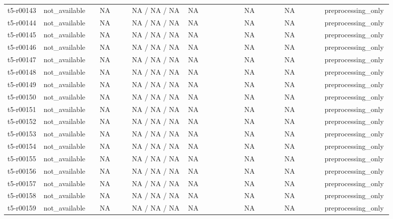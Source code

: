 \begin{longtable}{@{}p{0.09\linewidth}p{0.14\linewidth}p{0.08\linewidth}p{0.14\linewidth}p{0.14\linewidth}p{0.1\linewidth}p{0.1\linewidth}p{0.11\linewidth}@{}}
t5-r00143 & not\_\allowbreak{}available & NA & NA / NA / NA & NA & NA & NA & preprocessing\_\allowbreak{}only \\
t5-r00144 & not\_\allowbreak{}available & NA & NA / NA / NA & NA & NA & NA & preprocessing\_\allowbreak{}only \\
t5-r00145 & not\_\allowbreak{}available & NA & NA / NA / NA & NA & NA & NA & preprocessing\_\allowbreak{}only \\
t5-r00146 & not\_\allowbreak{}available & NA & NA / NA / NA & NA & NA & NA & preprocessing\_\allowbreak{}only \\
t5-r00147 & not\_\allowbreak{}available & NA & NA / NA / NA & NA & NA & NA & preprocessing\_\allowbreak{}only \\
t5-r00148 & not\_\allowbreak{}available & NA & NA / NA / NA & NA & NA & NA & preprocessing\_\allowbreak{}only \\
t5-r00149 & not\_\allowbreak{}available & NA & NA / NA / NA & NA & NA & NA & preprocessing\_\allowbreak{}only \\
t5-r00150 & not\_\allowbreak{}available & NA & NA / NA / NA & NA & NA & NA & preprocessing\_\allowbreak{}only \\
t5-r00151 & not\_\allowbreak{}available & NA & NA / NA / NA & NA & NA & NA & preprocessing\_\allowbreak{}only \\
t5-r00152 & not\_\allowbreak{}available & NA & NA / NA / NA & NA & NA & NA & preprocessing\_\allowbreak{}only \\
t5-r00153 & not\_\allowbreak{}available & NA & NA / NA / NA & NA & NA & NA & preprocessing\_\allowbreak{}only \\
t5-r00154 & not\_\allowbreak{}available & NA & NA / NA / NA & NA & NA & NA & preprocessing\_\allowbreak{}only \\
t5-r00155 & not\_\allowbreak{}available & NA & NA / NA / NA & NA & NA & NA & preprocessing\_\allowbreak{}only \\
t5-r00156 & not\_\allowbreak{}available & NA & NA / NA / NA & NA & NA & NA & preprocessing\_\allowbreak{}only \\
t5-r00157 & not\_\allowbreak{}available & NA & NA / NA / NA & NA & NA & NA & preprocessing\_\allowbreak{}only \\
t5-r00158 & not\_\allowbreak{}available & NA & NA / NA / NA & NA & NA & NA & preprocessing\_\allowbreak{}only \\
t5-r00159 & not\_\allowbreak{}available & NA & NA / NA / NA & NA & NA & NA & preprocessing\_\allowbreak{}only \\

\end{longtable}
